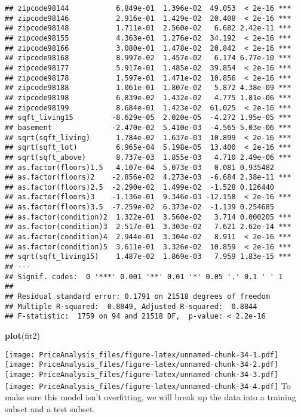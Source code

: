 \documentclass[]{article}
\newenvironment{Shaded}{\begin{snugshade}}{\end{snugshade}}
\newcommand{\KeywordTok}[1]{\textcolor[rgb]{0.13,0.29,0.53}{\textbf{#1}}}
\newcommand{\NormalTok}[1]{#1}
\begin{document}
\begin{verbatim}
## zipcode98144           6.849e-01  1.396e-02  49.053  < 2e-16 ***
## zipcode98146           2.916e-01  1.429e-02  20.408  < 2e-16 ***
## zipcode98148           1.711e-01  2.560e-02   6.682 2.42e-11 ***
## zipcode98155           4.363e-01  1.276e-02  34.192  < 2e-16 ***
## zipcode98166           3.080e-01  1.478e-02  20.842  < 2e-16 ***
## zipcode98168           8.997e-02  1.457e-02   6.174 6.77e-10 ***
## zipcode98177           5.917e-01  1.485e-02  39.854  < 2e-16 ***
## zipcode98178           1.597e-01  1.471e-02  10.856  < 2e-16 ***
## zipcode98188           1.061e-01  1.807e-02   5.872 4.38e-09 ***
## zipcode98198           6.839e-02  1.432e-02   4.775 1.81e-06 ***
## zipcode98199           8.684e-01  1.423e-02  61.025  < 2e-16 ***
## sqft_living15         -8.629e-05  2.020e-05  -4.272 1.95e-05 ***
## basement              -2.470e-02  5.410e-03  -4.565 5.03e-06 ***
## sqrt(sqft_living)      1.784e-02  1.637e-03  10.899  < 2e-16 ***
## sqrt(sqft_lot)         6.965e-04  5.198e-05  13.400  < 2e-16 ***
## sqrt(sqft_above)       8.737e-03  1.855e-03   4.710 2.49e-06 ***
## as.factor(floors)1.5   4.107e-04  5.073e-03   0.081 0.935482    
## as.factor(floors)2    -2.856e-02  4.273e-03  -6.684 2.38e-11 ***
## as.factor(floors)2.5  -2.290e-02  1.499e-02  -1.528 0.126440    
## as.factor(floors)3    -1.136e-01  9.346e-03 -12.158  < 2e-16 ***
## as.factor(floors)3.5  -7.259e-02  6.373e-02  -1.139 0.254685    
## as.factor(condition)2  1.322e-01  3.560e-02   3.714 0.000205 ***
## as.factor(condition)3  2.517e-01  3.303e-02   7.621 2.62e-14 ***
## as.factor(condition)4  2.944e-01  3.304e-02   8.911  < 2e-16 ***
## as.factor(condition)5  3.611e-01  3.326e-02  10.859  < 2e-16 ***
## sqrt(sqft_living15)    1.487e-02  1.869e-03   7.959 1.83e-15 ***
## ---
## Signif. codes:  0 '***' 0.001 '**' 0.01 '*' 0.05 '.' 0.1 ' ' 1
## 
## Residual standard error: 0.1791 on 21518 degrees of freedom
## Multiple R-squared:  0.8849, Adjusted R-squared:  0.8844 
## F-statistic:  1759 on 94 and 21518 DF,  p-value: < 2.2e-16
\end{verbatim}

\begin{Shaded}
\begin{Highlighting}[]
\KeywordTok{plot}\NormalTok{(fit2)}
\end{Highlighting}
\end{Shaded}

\texttt{[image: PriceAnalysis\_files/figure-latex/unnamed-chunk-34-1.pdf]}
\texttt{[image: PriceAnalysis\_files/figure-latex/unnamed-chunk-34-2.pdf]}
\texttt{[image: PriceAnalysis\_files/figure-latex/unnamed-chunk-34-3.pdf]}
\texttt{[image: PriceAnalysis\_files/figure-latex/unnamed-chunk-34-4.pdf]}
To make sure this model isn't overfitting, we will break up the data
into a training subset and a test subset.
\end{document}
